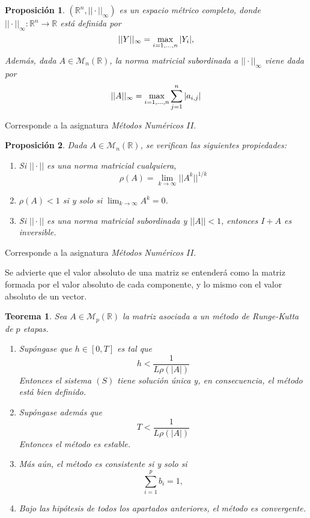 \documentclass[11pt]{report}
\makeatletter
\renewenvironment{proof}[1][\proofname]{\par
  \pushQED{\qed}%
  \normalfont \topsep\z@skip %
  \trivlist
  \item[\hskip\labelsep
        \itshape
    #1\@addpunct{.}]\ignorespaces
}{%
  \popQED\endtrivlist\@endpefalse
}
\theoremstyle{mytheorem}
\newtheorem{proposition}{Proposición}
\newtheorem{theorem}{Teorema}
\theoremstyle{mydefinition}
\theoremstyle{myexample}
\let\oldproofname=\proofname
\renewcommand{\proofname}{\rm\bf{\oldproofname}}}
\newenvironment{ctheorem} %
  {\begin{mdframed}[
        linewidth=3pt,
        linecolor=c2,
        bottomline=false,
        topline=false,
        rightline=false,
        innerrightmargin=0pt,
        innertopmargin=0pt,
        innerbottommargin=0pt,
        innerleftmargin=1em, %
        skipabove=\baselineskip]
    \begin{theorem}}
  {\end{theorem}\end{mdframed}}
\newenvironment{cproposition} %
  {\begin{mdframed}[
        linewidth=3pt,
        linecolor=c2,
        bottomline=false,
        topline=false,
        rightline=false,
        innerrightmargin=0pt,
        innertopmargin=0pt,
        innerbottommargin=0pt,
        innerleftmargin=1em, %
        skipabove=\baselineskip]
    \begin{proposition}}
  {\end{proposition}\end{mdframed}}
\newcommand{\R}{\mathbb R}
\makeatother
\begin{document}
\begin{cproposition}
$(\R^n,||\cdot||_\infty)$ es un espacio métrico completo, donde $||\cdot||_{\infty} \colon \R^n \to \R$ está definida por
\[||Y||_{\infty} = \max_{i=1,\mathellipsis,n}|Y_i|,\]
Además, dada $A \in \mathcal{M}_n(\R)$, la norma matricial subordinada a $||\cdot||_{\infty}$ viene dada por
\[||A||_{\infty} =\max_{i=1,\mathellipsis,n}\sum_{j=1}^n |a_{i,j}|\]
\end{cproposition}

\begin{proof}
    Corresponde a la asignatura \emph{Métodos Numéricos $II$}.
\end{proof}

\begin{cproposition}
\label{prop5}
Dada $A \in \mathcal{M}_n(\R)$, se verifican las siguientes propiedades:
\begin{enumerate}
    \item Si $||\cdot||$ es una norma matricial cualquiera,
    \[ \rho(A) = \lim_{k \to \infty}||A^k||^{1/k}\]
    \item $\rho(A) < 1$ si y solo si $\displaystyle \lim_{k \to \infty} A^k = 0$.
    \item Si $||\cdot||$ es una norma matricial subordinada y $||A|| <1$, entonces $I+A$ es inversible.
\end{enumerate}
\end{cproposition}

\begin{proof}
    Corresponde a la asignatura \emph{Métodos Numéricos $II$}.
\end{proof}

Se advierte que el valor absoluto de una matriz se entenderá como la matriz formada por el valor absoluto de cada componente, y lo mismo con el valor absoluto de un vector.

\begin{ctheorem}
Sea $A\in \mathcal{M}_p(\R)$ la matriz asociada a un método de Runge-Kutta de $p$ etapas. 
\begin{enumerate}
    \item Supóngase que $h \in [0,T]$ es tal que
    \[h < \frac{1}{L\rho(|A|)}\]
    Entonces el sistema $(S)$ tiene solución única y, en consecuencia, el método está bien definido.
    \item Supóngase además que
    \[T < \frac{1}{L\rho(|A|)}\]
    Entonces el método es estable.
    \item Más aún, el método es consistente si y solo si
    \[\sum_{i=1}^p b_i = 1,\]
    \item Bajo las hipótesis de todos los apartados anteriores, el método es convergente.
\end{enumerate}
\end{ctheorem}
\end{document}

